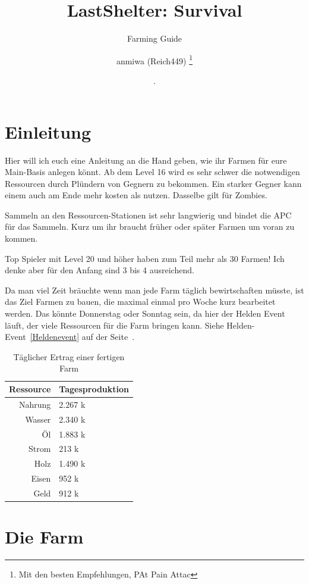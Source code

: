 \documentclass[fontsize=12pt,a4paper]{scrartcl}[2003/01/01]
\title{LastShelter: Survival}
\subtitle{Farming Guide}
\author{\textcopyleft{} anmiwa (Reich449)%
  \thanks{Mit den besten Empfehlungen, PAt Pain Attac}}
\date{\DTMfetchday{gitdate}. \DTMgermanmonthname{\DTMfetchmonth{gitdate}} \DTMfetchyear{gitdate}}
\begin{document}
\maketitle                  %
\tableofcontents            %
\listoffigures

\section{Einleitung}
Hier will ich euch eine Anleitung an die Hand geben, wie ihr Farmen für eure Main-Basis anlegen könnt.
Ab dem Level 16 wird es sehr schwer die notwendigen Ressourcen durch Plündern von Gegnern zu bekommen.
Ein starker Gegner kann einem auch am Ende mehr kosten als nutzen. Dasselbe gilt für Zombies.

Sammeln an den Ressourcen-Stationen ist sehr langwierig und bindet die APC für das Sammeln.
Kurz um ihr braucht früher oder später Farmen um voran zu kommen.

Top Spieler mit Level 20 und höher haben zum Teil mehr als 30 Farmen! Ich denke aber für den Anfang sind 3 bis 4 ausreichend.

Da man viel Zeit bräuchte wenn man jede Farm täglich bewirtschaften müsste, ist das Ziel Farmen zu bauen,
die maximal einmal pro Woche kurz bearbeitet werden. Das könnte Donnerstag oder Sonntag sein,
da hier der Helden Event läuft, der viele Ressourcen für die Farm bringen kann.
Siehe Helden-Event~\ref{Heldenevent} auf der Seite~\pageref{Heldenevent}.

\begin{table}[ht]
  \centering
    \begin{tabularx}{0.6\textwidth}{rl}
      Ressource & Tagesproduktion \\
      \hline
      Nahrung & 2.267 k \\
      Wasser & 2.340 k \\
      Öl & 1.883 k \\
      Strom & 213 k \\
      Holz & 1.490 k \\
      Eisen & 952 k \\
      Geld & 912 k \\
    \end{tabularx}
  \caption[Ertrag]{Täglicher Ertrag einer fertigen Farm}
\end{table}


\section{Die Farm}
\end{document}

